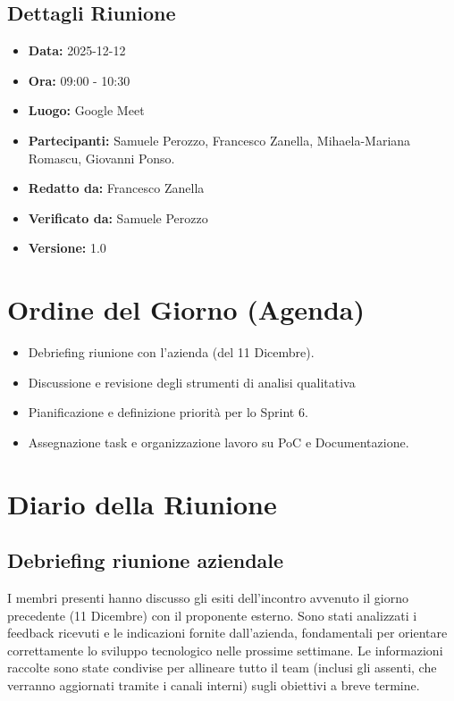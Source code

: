 \documentclass[a4paper, 11pt, oneside]{scrartcl}
\begin{document}
\subsection{Dettagli Riunione}
\begin{itemize}
    \item \textbf{Data:} 2025-12-12
    \item \textbf{Ora:} 09:00 - 10:30
    \item \textbf{Luogo:} Google Meet
    \item \textbf{Partecipanti:} Samuele Perozzo, Francesco Zanella, Mihaela-Mariana Romascu, Giovanni Ponso.
    \item \textbf{Redatto da:} Francesco Zanella
    \item \textbf{Verificato da:} Samuele Perozzo
    \item \textbf{Versione:} 1.0
\end{itemize}


\newpage
\section{Ordine del Giorno (Agenda)}
\begin{itemize}
    \item[1.] Debriefing riunione con l'azienda (del 11 Dicembre).
    \item[2.] Discussione e revisione degli strumenti di analisi qualitativa   
    \item[3.] Pianificazione e definizione priorità per lo Sprint 6.
    \item[4.] Assegnazione task e organizzazione lavoro su PoC e Documentazione.
\end{itemize}

\newpage
\section{Diario della Riunione}

\subsection{Debriefing riunione aziendale}
I membri presenti hanno discusso gli esiti dell'incontro avvenuto il giorno precedente (11 Dicembre) con il proponente esterno. Sono stati analizzati i feedback ricevuti e le indicazioni fornite dall'azienda, fondamentali per orientare correttamente lo sviluppo tecnologico nelle prossime settimane. Le informazioni raccolte sono state condivise per allineare tutto il team (inclusi gli assenti, che verranno aggiornati tramite i canali interni) sugli obiettivi a breve termine.
\end{document}
